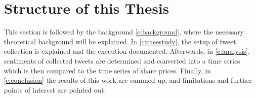 \section{Structure of this Thesis}
\label{s:introduction-structureofthisthesis}

This section is followed by the background \cref{c:background}, where the necessary theoretical background will be explained. 
In \cref{c:casestudy}, the setup of tweet collection is explained and the execution documented.
Afterwards, in \cref{c:analysis}, sentiments of collected tweets are determined and converted into a time series which is then compared to the time series of share prices.
Finally, in \cref{c:conclusion} the results of this work are summed up, and limitations and further points of interest are pointed out.